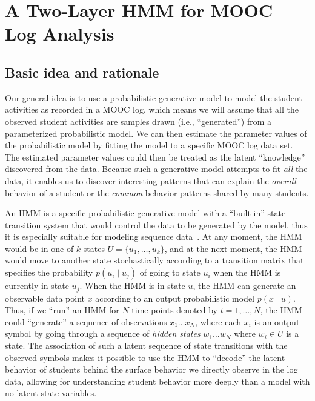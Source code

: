 \section{A Two-Layer HMM for MOOC Log Analysis}

\subsection{Basic idea and rationale}

Our general idea is to use a probabilistic generative model to model the
student activities as recorded in a MOOC log, which means we will assume
that all the observed student activities are samples drawn (i.e.,
``generated'') from a parameterized probabilistic model. We can then
estimate the parameter values of the probabilistic model by fitting the
model to a specific MOOC log data set. The estimated parameter values could
then be treated as the latent ``knowledge'' discovered from the data.
Because such a generative model attempts to fit \emph{all} the data, it
enables us to discover interesting patterns that can explain the
\emph{overall} behavior of a student or the \emph{common} behavior patterns
shared by many students.

An HMM is a specific probabilistic generative model with a ``built-in''
state transition system that would control the data to be generated by the
model, thus it is especially suitable for modeling sequence
data~\cite{Rabiner:1990:RSR, Huang:1990:HMM}. At any moment, the HMM would
be in one of $k$ states $U=\{u_1,\ldots,u_k\}$, and at the next moment, the
HMM would move to another state stochastically according to a transition
matrix that specifies the probability $p(u_i \mid u_j)$ of going to state
$u_i$ when the HMM is currently in state $u_j$. When the HMM is in state
$u$, the HMM can generate an observable data point $x$ according to an
output probabilistic model $p(x \mid u)$. Thus, if we ``run'' an HMM for $N$
time points denoted by $t=1,\ldots,N$, the HMM could ``generate'' a sequence
of observations $x_1 \ldots x_N$, where each $x_i$ is an output symbol by
going through a sequence of \emph{hidden states} $w_1 \ldots w_N$ where
$w_i \in U$ is a state. The association of such a latent sequence of state
transitions with the observed symbols makes it possible to use the HMM to
``decode'' the latent behavior of students behind the surface behavior we
directly observe in the log data, allowing for understanding student
behavior more deeply than a model with no latent state variables.

